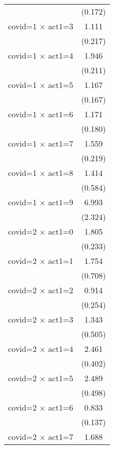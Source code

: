 {\begin{tabular}{l*{1}{c}}
                    &     (0.172)         \\
[1em]
covid=1 $\times$ act1=3&       1.111         \\
                    &     (0.217)         \\
[1em]
covid=1 $\times$ act1=4&       1.946\sym{***}\\
                    &     (0.211)         \\
[1em]
covid=1 $\times$ act1=5&       1.167         \\
                    &     (0.167)         \\
[1em]
covid=1 $\times$ act1=6&       1.171         \\
                    &     (0.180)         \\
[1em]
covid=1 $\times$ act1=7&       1.559\sym{**} \\
                    &     (0.219)         \\
[1em]
covid=1 $\times$ act1=8&       1.414         \\
                    &     (0.584)         \\
[1em]
covid=1 $\times$ act1=9&       6.993\sym{***}\\
                    &     (2.324)         \\
[1em]
covid=2 $\times$ act1=0&       1.805\sym{***}\\
                    &     (0.233)         \\
[1em]
covid=2 $\times$ act1=1&       1.754         \\
                    &     (0.708)         \\
[1em]
covid=2 $\times$ act1=2&       0.914         \\
                    &     (0.254)         \\
[1em]
covid=2 $\times$ act1=3&       1.343         \\
                    &     (0.505)         \\
[1em]
covid=2 $\times$ act1=4&       2.461\sym{***}\\
                    &     (0.402)         \\
[1em]
covid=2 $\times$ act1=5&       2.489\sym{***}\\
                    &     (0.498)         \\
[1em]
covid=2 $\times$ act1=6&       0.833         \\
                    &     (0.137)         \\
[1em]
covid=2 $\times$ act1=7&       1.688\sym{**} \\

\end{tabular}}
